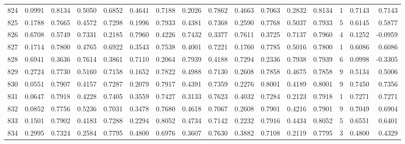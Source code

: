 \begin{tabular}{lrrrrrrrrrrrrrrr}
824 &      0.0991 &  0.8134 &  0.5050 &  0.6852 &  0.4641 &  0.7188 &  0.2026 &  0.7862 &  0.4663 &  0.7063 &   0.2832 &     0.8134 &      1 &                    0.7143 &                     0.7143 \\
825 &      0.1788 &  0.7665 &  0.4572 &  0.7298 &  0.1996 &  0.7933 &  0.4381 &  0.7368 &  0.2590 &  0.7768 &   0.5037 &     0.7933 &      5 &                    0.6145 &                     0.5877 \\
826 &      0.6708 &  0.5749 &  0.7331 &  0.2185 &  0.7960 &  0.4226 &  0.7432 &  0.3377 &  0.7611 &  0.3725 &   0.7137 &     0.7960 &      4 &                    0.1252 &                    -0.0959 \\
827 &      0.1714 &  0.7800 &  0.4765 &  0.6922 &  0.3543 &  0.7538 &  0.4001 &  0.7221 &  0.1760 &  0.7785 &   0.5016 &     0.7800 &      1 &                    0.6086 &                     0.6086 \\
828 &      0.6941 &  0.3636 &  0.7614 &  0.3861 &  0.7110 &  0.2064 &  0.7939 &  0.4188 &  0.7294 &  0.2336 &   0.7938 &     0.7939 &      6 &                    0.0998 &                    -0.3305 \\
829 &      0.2724 &  0.7730 &  0.5160 &  0.7158 &  0.1652 &  0.7822 &  0.4988 &  0.7130 &  0.2608 &  0.7858 &   0.4675 &     0.7858 &      9 &                    0.5134 &                     0.5006 \\
830 &      0.0551 &  0.7907 &  0.4157 &  0.7287 &  0.2079 &  0.7917 &  0.4391 &  0.7359 &  0.2276 &  0.8001 &   0.4189 &     0.8001 &      9 &                    0.7450 &                     0.7356 \\
831 &      0.0647 &  0.7918 &  0.4228 &  0.7405 &  0.3559 &  0.7427 &  0.3133 &  0.7623 &  0.4032 &  0.7284 &   0.2123 &     0.7918 &      1 &                    0.7271 &                     0.7271 \\
832 &      0.0852 &  0.7756 &  0.5236 &  0.7031 &  0.3478 &  0.7680 &  0.4618 &  0.7067 &  0.2608 &  0.7901 &   0.4216 &     0.7901 &      9 &                    0.7049 &                     0.6904 \\
833 &      0.1501 &  0.7902 &  0.4183 &  0.7288 &  0.2294 &  0.8052 &  0.4734 &  0.7142 &  0.2232 &  0.7916 &   0.4434 &     0.8052 &      5 &                    0.6551 &                     0.6401 \\
834 &      0.2995 &  0.7324 &  0.2584 &  0.7795 &  0.4800 &  0.6976 &  0.3607 &  0.7630 &  0.3882 &  0.7108 &   0.2119 &     0.7795 &      3 &                    0.4800 &                     0.4329 \\

\end{tabular}
